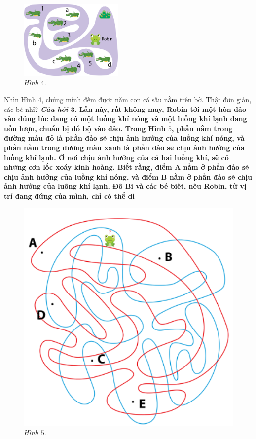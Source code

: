 	\begin{figure}[H]
		\centering
		\vspace*{-10pt}
		\captionsetup{labelformat= empty, justification=centering}
		\includegraphics[width=0.45\textwidth]{pic13}
		\caption{\small\textit{Hình $4.$}}
		\vspace*{-10pt}
	\end{figure}
	Nhìn Hình $4$, chúng mình đếm được năm con cá sấu nằm trên bờ. Thật đơn giản, các bé nhỉ?
	\vskip 0.1cm
	\textbf{\textit{Câu hỏi $\pmb{3.}$} {\color{abc}Lần này, rất không may, Robin tới một hòn đảo vào đúng lúc đang có một luồng khí nóng và một luồng khí lạnh đang uốn lượn, chuẩn bị đổ bộ vào đảo. Trong  Hình $5$, phần nằm trong đường màu đỏ là phần đảo sẽ chịu ảnh hưởng của luồng khí nóng, và phần nằm trong đường màu xanh là phần đảo sẽ chịu ảnh hưởng của luồng khí lạnh. Ở nơi chịu ảnh hưởng của cả hai luồng khí, sẽ có những cơn lốc xoáy kinh hoàng. Biết rằng, điểm $\pmb A$ nằm ở phần đảo sẽ chịu ảnh hưởng của luồng khí nóng, và điểm $\pmb B$ nằm ở phần đảo sẽ chịu ảnh hưởng của luồng khí lạnh. Đố Bi và các bé biết, nếu Robin, từ vị trí đang đứng của mình, chỉ có thể di}}
	\begin{figure}
		\vspace*{-5pt}
		\centering
		\captionsetup{labelformat=empty, justification=centering}
		\includegraphics[scale=0.38]{5}
		\caption{\textit{\small Hình $5.$}}
		\vspace*{-15pt}
	\end{figure}
